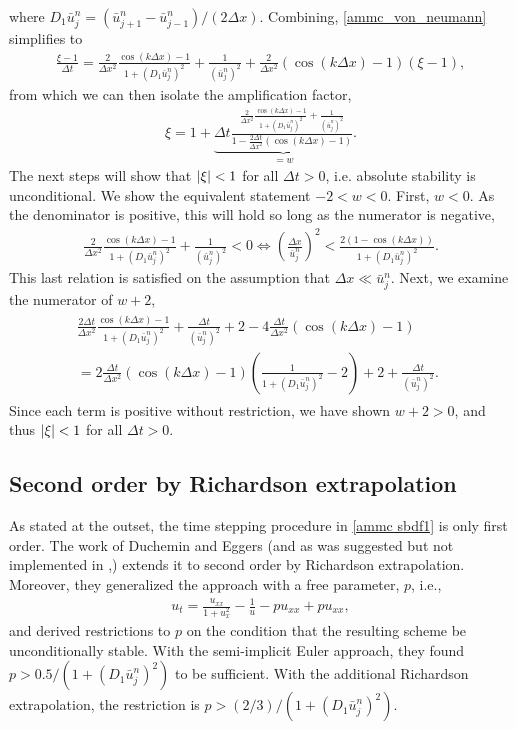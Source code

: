 where $D_1\bar u^n_j = (\bar u^n_{j+1} -  \bar u^n_{j-1})/(2\Delta x)$.
Combining, \eqref{ammc_von_neumann} simplifies to 
\begin{align}
        \frac{\xi - 1}{\Delta t} 
= \frac{2}{\Delta x^2}\frac{\cos(k\Delta x)-1}{1 +(
	D_1\bar u^n_j 
	)^2}
+ \frac{1}{(\bar u_j^n)^2}
+ \frac{2}{\Delta x^2}(\cos(k\Delta x)-1)(\xi-1),
\end{align}
from which we can then isolate the amplification factor,
\begin{align}
        \xi 
= 1+\underbrace{\Delta t \frac{\frac{2}{\Delta x^2}\frac{\cos(k\Delta x)-1}{1 +(
	D_1\bar u^n_j 
	)^2}
+ \frac{1}{(\bar u_j^n)^2}}{1-\frac{2\Delta t}{\Delta x^2}(\cos(k\Delta x)-1)}}_{=w}.
\end{align}
The next steps will show that $\left|\xi\right| < 1$ for all $\Delta t > 0$, i.e. absolute stability is unconditional. We show the equivalent statement $-2 < w < 0$. First, $w<0$. As the denominator is positive, this will hold so long as the numerator is negative, 
\begin{align}
\frac{2}{\Delta x^2}\frac{\cos(k\Delta x)-1}{1 +(
	D_1\bar u^n_j 
	)^2}
+ \frac{1}{(\bar u_j^n)^2} < 0 
\iff 
\left(\frac{\Delta x}{\bar u^n_j} \right)^2 
< \frac{2(1-\cos(k\Delta x))}{1 + (D_1\bar u^n_j)^2}.
\end{align}
This last relation is satisfied on the assumption that $\Delta x \ll \bar u^n_j$.  Next, we examine the numerator of $w+2$,
\begin{align}
\begin{split}
  \frac{2\Delta t}{\Delta x^2}\frac{\cos(k\Delta x)-1}{1 + (D_1 \bar u^n_j)^2} 
  + \frac{\Delta t}{(\bar u^n_j)^2} + 2 - 4\frac{\Delta t}{\Delta x^2}(\cos(k\Delta x)-1) 
  \phantom{aaaa}
\\
= 2\frac{\Delta t}{\Delta x^2}(\cos(k\Delta x)-1)\left(
\frac{1}{1 + (D_1 \bar u^n_j)^2} - 2 \right)
+ 2 + \frac{\Delta t}{(\bar u^n_j)^2}.
\end{split}
\end{align}
Since each term is positive without restriction, we have shown $w+2 > 0$, and thus $\left|\xi\right| < 1$ for all $\Delta t > 0$.

\subsection{Second order by Richardson extrapolation}
As stated at the outset, the time stepping procedure in \eqref{ammc sbdf1} is only first order. The work of Duchemin and Eggers \cite{duchemin2014explicit} (and as was suggested but not implemented in \cite{smereka2003semi},) extends it to second order by Richardson extrapolation.  Moreover, they generalized the approach with a free parameter, $p$, i.e.,
\begin{align}
u_t = \frac{u_{xx}}{1 + u_x^2} - \frac{1}{u} - pu_{xx} + pu_{xx}, 
\end{align}
and derived restrictions to $p$ on the condition that the resulting scheme be unconditionally stable. With the semi-implicit Euler approach, they found $p > 0.5/(1 + (D_1 \bar u^n_j)^2)$ to be sufficient. With the additional Richardson extrapolation, the restriction is $p > (2/3)/(1 + (D_1 \bar u^n_j)^2)$.

